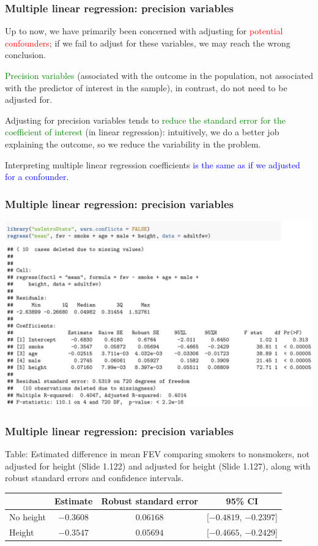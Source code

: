 \documentclass[12pt, 
hyperref={colorlinks=true, linkcolor=blue, urlcolor=cyan},dvipsnames]{beamer}
\begin{document}
\begin{frame}
\frametitle{Multiple linear regression: precision variables}

Up to now, we have primarily been concerned with adjusting for \textcolor{red}{potential confounders}; if we fail to adjust for these variables, we may reach the wrong conclusion.

\textcolor{green}{Precision variables} (associated with the outcome in the population, not associated with the predictor of interest in the sample), in contrast, do not need to be adjusted for.

Adjusting for precision variables tends to \textcolor{green}{reduce the standard error for the coefficient of interest} (in linear regression): intuitively, we do a better job explaining the outcome, so we reduce the variability in the problem. 

Interpreting multiple linear regression coefficients \textcolor{blue}{is the same as if we adjusted for a confounder}.
\end{frame}

\begin{frame}
\frametitle{Multiple linear regression: precision variables}
\begin{center}
\vspace{-1cm}\hspace*{-0.5cm}\includegraphics[width=1.1\textwidth]{plots/fev_vs_smoke_adjust_adultfev.png}
\end{center}

\end{frame}

\begin{frame}
\frametitle{Multiple linear regression: precision variables}
Table: Estimated difference in mean FEV comparing smokers to nonsmokers, not adjusted for height (Slide 1.122) and adjusted for height (Slide 1.127), along with robust standard errors and confidence intervals.

\hspace*{-1cm}\begin{tabular}{lccc}
\hline 
 & Estimate & Robust standard error & 95\% CI \\
 \hline 
No height & $-0.3608$ & $0.06168$  & [$-0.4819$, $-0.2397$]\\
Height & $-0.3547$ & $0.05694$ & [$-0.4665$, $-0.2429$]
\end{tabular}
\end{frame}
\end{document}
